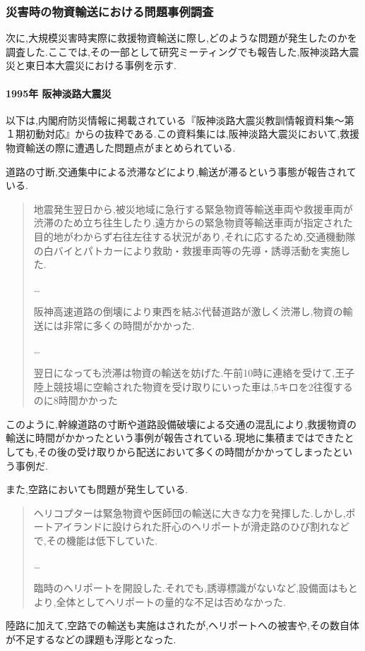 \documentclass{article}[jsarticle]
\begin{document}
\subsubsection{災害時の物資輸送における問題事例調査}
次に,大規模災害時実際に救援物資輸送に際し,どのような問題が発生したのかを調査した.ここでは,その一部として研究ミーティングでも報告した,阪神淡路大震災と東日本大震災における事例を示す.
\paragraph{1995年 阪神淡路大震災} 
以下は,内閣府防災情報に掲載されている『阪神淡路大震災教訓情報資料集～第１期初動対応\cite{doc03}』からの抜粋である.この資料集には,阪神淡路大震災において,救援物資輸送の際に遭遇した問題点がまとめられている.\par
道路の寸断,交通集中による渋滞などにより,輸送が滞るという事態が報告されている.
\begin{quote}
    地震発生翌日から,被災地域に急行する緊急物資等輸送車両や救援車両が渋滞のため立ち往生したり,遠方からの緊急物資等輸送車両が指定された目的地がわからず右往左往する状況があり,それに応するため,交通機動隊の白バイとパトカーにより救助・救援車両等の先導・誘導活動を実施した.\par 
    \ldots \par
    阪神高速道路の倒壊により東西を結ぶ代替道路が激しく渋滞し,物資の輸送には非常に多くの時間がかかった.\par 
    \ldots \par
    翌日になっても渋滞は物資の輸送を妨げた.午前10時に連絡を受けて,王子陸上競技場に空輸された物資を受け取りにいった車は,5キロを2往復するのに8時間かかった
\end{quote}
このように,幹線道路の寸断や道路設備破壊による交通の混乱により,救援物資の輸送に時間がかかったという事例が報告されている.現地に集積まではできたとしても,その後の受け取りから配送において多くの時間がかかってしまったという事例だ. \par 
また,空路においても問題が発生している.
\begin{quote}
    ヘリコプターは緊急物資や医師団の輸送に大きな力を発揮した.しかし,ポートアイランドに設けられた肝心のヘリポートが滑走路のひび割れなどで,その機能は低下していた.\par
    \ldots \par
    臨時のヘリポートを開設した.それでも,誘導標識がないなど,設備面はもとより,全体としてヘリポートの量的な不足は否めなかった.
\end{quote}
陸路に加えて,空路での輸送も実施はされたが,ヘリポートへの被害や,その数自体が不足するなどの課題も浮彫となった.
\end{document}
